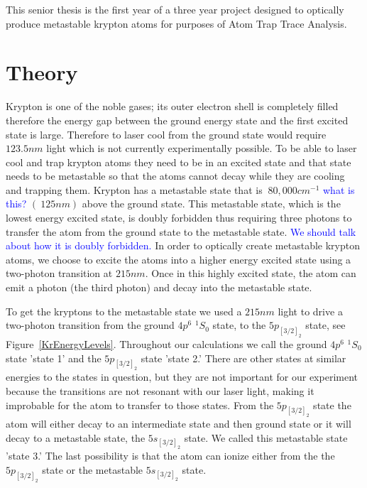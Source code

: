 \documentclass[prb,preprint]{revtex4-1}
\begin{document}
This senior thesis is the first year of a three year project designed to optically produce metastable krypton atoms for purposes of Atom Trap Trace Analysis.

\section{Theory}

Krypton is one of the noble gases; its outer electron shell is completely filled therefore the energy gap between the ground energy state and the first excited state is large. Therefore to laser cool from the ground state would require $123.5 nm$ light which is not currently experimentally possible. To be able to laser cool and trap krypton atoms they need to be in an excited state and that state needs to be metastable so that the atoms cannot decay while they are cooling and trapping them. Krypton has a metastable state that is $~80,000 cm^{-1}$ \textcolor{blue}{what is this?} $(~125 nm)$ above the ground state.  This metastable state, which is the lowest energy excited state, is doubly forbidden thus requiring three photons to transfer the atom from the ground state to the metastable state. \textcolor{blue}{We should talk about how it is doubly forbidden.} In order to optically create metastable krypton atoms, we choose to excite the atoms into a higher energy excited state using a two-photon transition at $215 nm$.  Once in this highly excited state, the atom can emit a photon (the third photon) and decay into the metastable state. 

To get the kryptons to the metastable state we used a $215 nm$ light to drive a two-photon transition from the ground $4p^6$ $^1S_0$ state, to the $5p_{[3/2]_2}$ state, see Figure~\ref{KrEnergyLevels}. Throughout our calculations we call the ground $4p^6$ $^1S_0$ state 'state 1' and the $5p_{[3/2]_2}$ state 'state 2.' There are other states at similar energies to the states in question, but they are not important for our experiment because the transitions are not resonant with our laser light, making it improbable for the atom to transfer to those states. From the $5p_{[3/2]_2}$ state the atom will either decay to an intermediate state and then ground state or it will decay to a metastable state, the $5s_{[3/2]_2}$ state. We called this metastable state 'state 3.' The last possibility is that the atom can ionize either from the the $5p_{[3/2]_2}$ state or the metastable $5s_{[3/2]_2}$ state. 
\end{document}
